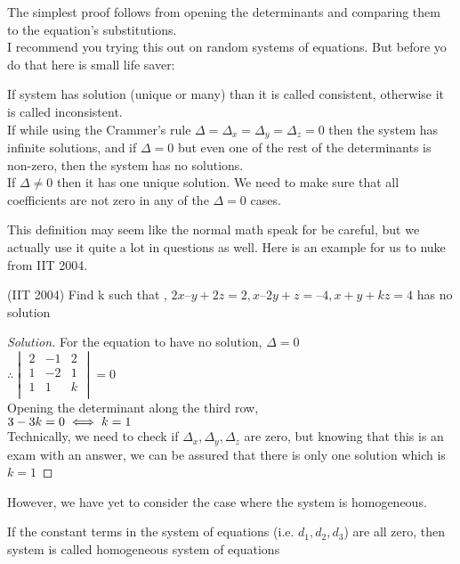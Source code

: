 The simplest proof follows from opening the determinants and comparing them to the equation's substitutions.\\
I recommend you trying this out on random systems of equations. But before yo do that here is small life saver:\\
\begin{definition}
    If system has solution (unique or many) than it is called consistent, otherwise it is called inconsistent.\\
    If while using the Crammer's rule $\Delta=\Delta_x=\Delta_y=\Delta_z=0$ then the system has infinite solutions, and if $\Delta=0$ but even one of the rest of the determinants is non-zero, then the system has no solutions.\\
    If $\Delta\neq0$ then it has one unique solution. We need to make sure that all coefficients are not zero in any of the $\Delta=0$ cases.
\end{definition}
This definition may seem like the normal math speak for be careful, but we actually use it quite a lot in questions as well. Here is an example for us to nuke from IIT 2004.\\
\begin{example}
    (IIT 2004) Find k such that , $2x – y + 2z = 2, x – 2y + z = –4, x + y + kz = 4$ has no solution
\end{example}
\begin{proof}
    [Solution]
    For the equation to have no solution, $\Delta=0$\\
    $\therefore \begin{vmatrix}
        2 & -1 & 2\\
        1 & -2 & 1\\
        1 & 1 & k\\
    \end{vmatrix}=0$\\
    Opening the determinant along the third row,\\
    $3-3k=0\\
    \iff k=1$\\
    Technically, we need to check if $\Delta_x, \Delta_y, \Delta_z$ are zero, but knowing that this is an exam with an answer, we can be assured that there is only one solution which is $k=1$
\end{proof}
However, we have yet to consider the case where the system is homogeneous.\\
\begin{definition}
    If the constant terms in the system of equations (i.e. $d_1,d_2,d_3$) are all zero, then system is called homogeneous system of equations
\end{definition}
